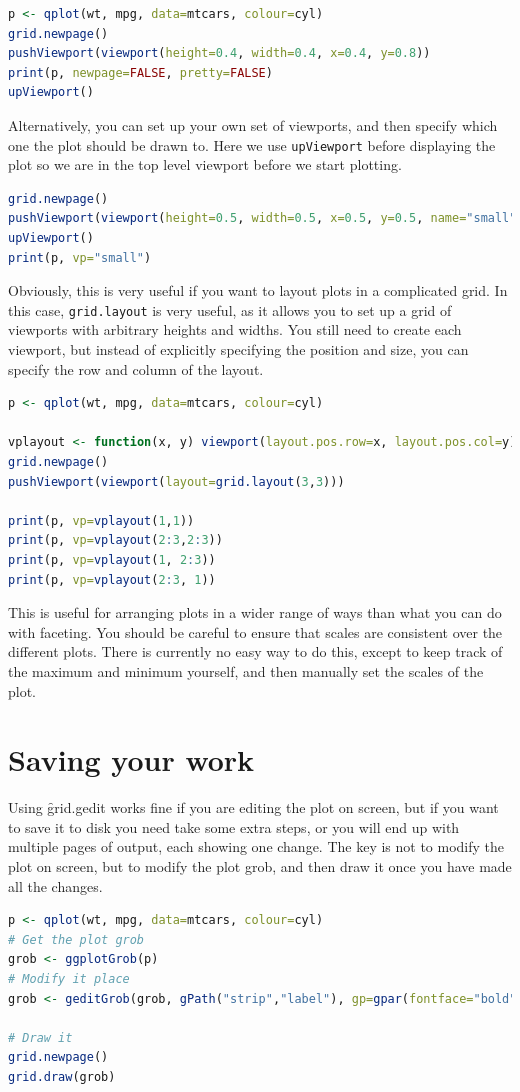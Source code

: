 \begin{lstlisting}[language = R]
p <- qplot(wt, mpg, data=mtcars, colour=cyl)
grid.newpage()
pushViewport(viewport(height=0.4, width=0.4, x=0.4, y=0.8))
print(p, newpage=FALSE, pretty=FALSE)
upViewport()
\end{lstlisting}

Alternatively, you can set up your own set of viewports, and then specify which one the plot should be drawn to.  Here we use {\tt upViewport} before displaying the plot so we are in the top level viewport before we start plotting.

\begin{lstlisting}[language = R]
grid.newpage()
pushViewport(viewport(height=0.5, width=0.5, x=0.5, y=0.5, name="small", angle=40))
upViewport()
print(p, vp="small")
\end{lstlisting}

Obviously, this is very useful if you want to layout plots in a complicated grid.  In this case, {\tt grid.layout} is very useful, as it allows you to set up a grid of viewports with arbitrary heights and widths.  You still need to create each viewport, but instead of explicitly specifying the position and size, you can specify the row and column of the layout.

\begin{lstlisting}[language = R]
p <- qplot(wt, mpg, data=mtcars, colour=cyl)

vplayout <- function(x, y) viewport(layout.pos.row=x, layout.pos.col=y)
grid.newpage()
pushViewport(viewport(layout=grid.layout(3,3)))

print(p, vp=vplayout(1,1))
print(p, vp=vplayout(2:3,2:3))
print(p, vp=vplayout(1, 2:3))
print(p, vp=vplayout(2:3, 1))
\end{lstlisting}

This is useful for arranging plots in a wider range of ways than what you can do with faceting.   You should be careful to ensure that scales are consistent over the different plots.  There is currently no easy way to do this, except to keep track of the maximum and minimum yourself, and then manually set the scales of the plot.

\section{Saving your work} 
\label{sec:saving_your_work}

Using \f{grid.gedit} works fine if you are editing the plot on screen, but if you want to save it to disk you need take some extra steps, or you will end up with multiple pages of output, each showing one change.  The key is not to modify the plot on screen, but to modify the plot grob, and then draw it once you have made all the changes.  

\begin{lstlisting}[language = R]
p <- qplot(wt, mpg, data=mtcars, colour=cyl)
# Get the plot grob
grob <- ggplotGrob(p)
# Modify it place
grob <- geditGrob(grob, gPath("strip","label"), gp=gpar(fontface="bold"))

# Draw it
grid.newpage()
grid.draw(grob)
\end{lstlisting}


